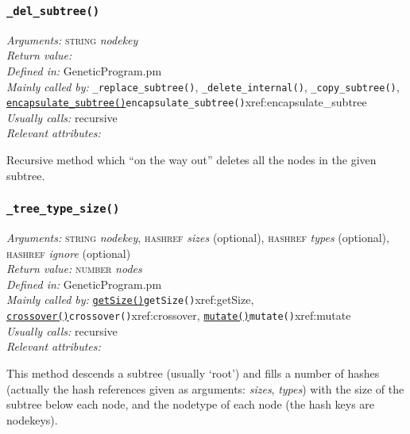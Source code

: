 \documentclass[a4paper]{article}
\begin{document}
\subsubsection{\texttt{\_del\_subtree()}}\label{xref:_del_subtree}
\begin{flushleft}
\textit{Arguments:} \textsc{string} \textit{nodekey}\\
\textit{Return value:} \\
\textit{Defined in:} GeneticProgram.pm\\
\textit{Mainly called by:} \texttt{\_replace\_subtree()}, \texttt{\_delete\_internal()}, \texttt{\_copy\_subtree()}, \hyperref[no]{\texttt{encapsulate\_subtree()}}{\texttt{encapsulate\_subtree()}}{xref:encapsulate_subtree}\\
\textit{Usually calls:} recursive\\
\textit{Relevant attributes:}
\end{flushleft}

Recursive method which ``on the way out'' deletes all the nodes in the
given subtree.


\subsubsection{\texttt{\_tree\_type\_size()}}\label{xref:_tree_type_size}
\begin{flushleft}
\textit{Arguments:} \textsc{string} \textit{nodekey}, \textsc{hashref} \textit{sizes} (optional), \textsc{hashref} \textit{types} (optional), \textsc{hashref} \textit{ignore} (optional)\\
\textit{Return value:} \textsc{number} \textit{nodes}\\
\textit{Defined in:} GeneticProgram.pm\\
\textit{Mainly called by:} \hyperref[no]{\texttt{getSize()}}{\texttt{getSize()}}{xref:getSize}, \hyperref[no]{\texttt{crossover()}}{\texttt{crossover()}}{xref:crossover}, \hyperref[no]{\texttt{mutate()}}{\texttt{mutate()}}{xref:mutate}\\
\textit{Usually calls:} recursive\\
\textit{Relevant attributes:}
\end{flushleft}

This method descends a subtree (usually `root') and fills a number of
hashes (actually the hash references given as arguments:
\textit{sizes}, \textit{types}) with the size of the subtree below
each node, and the nodetype of each node (the hash keys are nodekeys).
\end{document}
